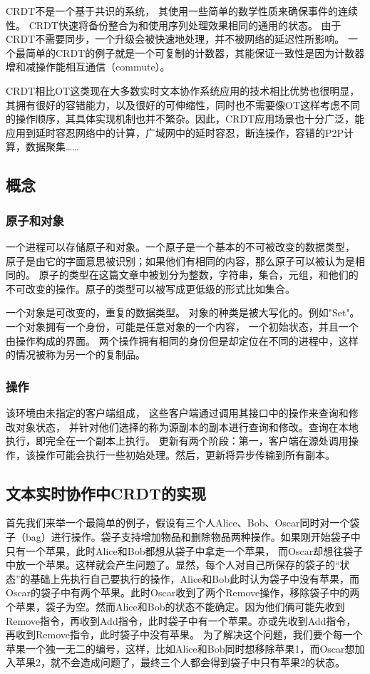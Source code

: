 \documentclass[11pt]{ctexart}
\begin{document}
CRDT不是一个基于共识的系统，
其使用一些简单的数学性质来确保事件的连续性。
CRDT快速将备份整合为和使用序列处理效果相同的通用的状态。
由于CRDT不需要同步，一个升级会被快速地处理，并不被网络的延迟性所影响。
一个最简单的CRDT的例子就是一个可复制的计数器，其能保证一致性是因为计数器增和减操作能相互通信（commute）。

CRDT相比OT这类现在大多数实时文本协作系统应用的技术相比优势也很明显，其拥有很好的容错能力，以及很好的可伸缩性，同时也不需要像OT这样考虑不同的操作顺序，其具体实现机制也并不繁杂。因此，CRDT应用场景也十分广泛，能应用到延时容忍网络中的计算，广域网中的延时容忍，断连操作，容错的P2P计算，数据聚集……

\subsection{概念}
\subsubsection{原子和对象}
一个进程可以存储原子和对象。一个原子是一个基本的不可被改变的数据类型，
原子是由它的字面意思被识别；如果他们有相同的内容，那么原子可以被认为是相同的。
原子的类型在这篇文章中被划分为整数，字符串，集合，元组，和他们的不可改变的操作。原子的类型可以被写成更低级的形式比如集合。

一个对象是可改变的，重复的数据类型。
对象的种类是被大写化的。例如"Set"。
一个对象拥有一个身份，可能是任意对象的一个内容，
一个初始状态，并且一个由操作构成的界面。
两个操作拥有相同的身份但是却定位在不同的进程中，这样的情况被称为另一个的复制品。

\subsubsection{操作}
该环境由未指定的客户端组成，
这些客户端通过调用其接口中的操作来查询和修改对象状态，
并针对他们选择的称为源副本的副本进行查询和修改。查询在本地执行，即完全在一个副本上执行。
更新有两个阶段：第一，客户端在源处调用操作，该操作可能会执行一些初始处理。然后，更新将异步传输到所有副本。

\subsection{文本实时协作中CRDT的实现}
首先我们来举一个最简单的例子，假设有三个人Alice、Bob、Oscar同时对一个袋子（bag）进行操作。袋子支持增加物品和删除物品两种操作。如果刚开始袋子中只有一个苹果，此时Alice和Bob都想从袋子中拿走一个苹果，
而Oscar却想往袋子中放一个苹果。这样就会产生问题了。显然，每个人对自己所保存的袋子的“状态”的基础上先执行自己要执行的操作，Alice和Bob此时认为袋子中没有苹果，而Oscar的袋子中有两个苹果。此时Oscar收到了两个Remove操作，移除袋子中的两个苹果，袋子为空。然而Alice和Bob的状态不能确定。因为他们俩可能先收到Remove指令，再收到Add指令，此时袋子中有一个苹果。亦或先收到Add指令，再收到Remove指令，此时袋子中没有苹果。
为了解决这个问题，我们要个每一个苹果一个独一无二的编号，这样，比如Alice和Bob同时想移除苹果1，而Oscar想加入苹果2，就不会造成问题了，最终三个人都会得到袋子中只有苹果2的状态。
\end{document}
